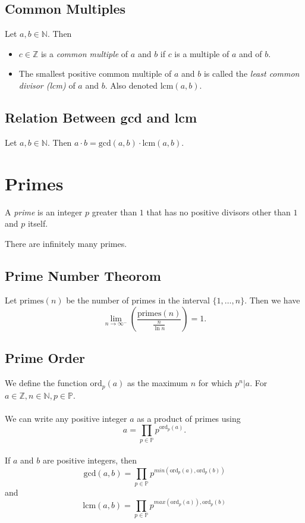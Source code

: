 \documentclass[fleqn]{article}
\begin{document}
\subsection{Common Multiples}
Let $a,b \in \mathbb{N}$. Then
\begin{itemize}
    \item $c \in \mathbb{Z}$ is a \textit{common multiple} of $a$ and $b$ if $c$ is a multiple of $a$ and of $b$.
    \item The smallest positive common multiple of $a$ and $b$ is called the
        \textit{least common divisor (lcm)} of $a$ and $b$. Also denoted
        $\text{lcm}(a,b)$.
\end{itemize}

\subsection{Relation Between gcd and lcm}
Let $a,b \in \mathbb{N}$. Then $a \cdot b = \text{gcd}(a,b) \cdot \text{lcm}(a,b)$.

\section{Primes}
A \textit{prime} is an integer $p$ greater than $1$ that has no positive divisors
other than $1$ and $p$ itself.

There are infinitely many primes.

\subsection{Prime Number Theorom}
Let $\text{primes}(n)$ be the number of primes in the interval $\{1,\dots,n\}$.
Then we have
\begin{equation*}
    \lim_{n \to \infty^-} \left( \frac{\text{primes}(n)}{\frac{n}{\ln n}} \right) = 1.
\end{equation*}

\subsection{Prime Order}
We define the function $\text{ord}_p(a)$ as the maximum $n$ for which $p^n | a$.
For $a \in \mathbb{Z}, n \in \mathbb{N}, p \in \mathbb{P}$.\\
\\
We can write any positive integer $a$ as a product of primes using
\begin{equation*}
    a = \prod_{p\in\mathbb{P}} p^{\text{ord}_p(a)}.
\end{equation*}
\\
If $a$ and $b$ are positive integers, then
\begin{equation*}
    \text{gcd}(a,b) = \prod_{p\in\mathbb{P}} p^{min(\text{ord}_p(a),\text{ord}_p(b))}
\end{equation*}
and
\begin{equation*}
    \text{lcm}(a,b) = \prod_{p\in\mathbb{P}} p^{max(\text{ord}_p(a)),\text{ord}_p(b)}
\end{equation*}
\end{document}
